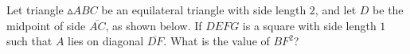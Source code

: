 Let triangle $\vartriangle ABC$ be an equilateral triangle with side length $2$, and let $D$ be the midpoint of side $\overline{AC}$, as shown below. If $DEFG$ is a square with side length $1$ such that $A$ lies on diagonal $\overline{DF}$. What is the value of $BF^2$?
